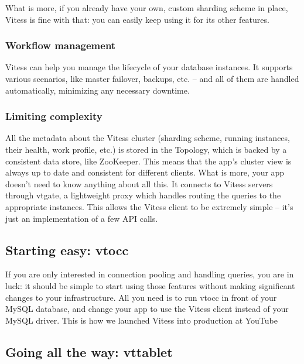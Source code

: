 What is more, if you already have your own, custom sharding scheme in place,
Vitess is fine with that: you can easily keep using it for its other features.

\subsubsection{Workflow management}\hypertarget{workflow-management}{}\label{workflow-management}

Vitess can help you manage the lifecycle of your database instances. It supports
various scenarios, like master failover, backups, etc. – and all of them are
handled automatically, minimizing any necessary downtime.

\subsubsection{Limiting complexity}\hypertarget{limiting-complexity}{}\label{limiting-complexity}

All the metadata about the Vitess cluster (sharding scheme, running instances,
their health, work profile, etc.) is stored in the Topology, which is backed by
a consistent data store, like ZooKeeper. This means that the app’s cluster view
is always up to date and consistent for different clients. What is more, your
app doesn’t need to know anything about all this. It connects to Vitess servers
through vtgate, a lightweight proxy which handles routing the queries to the
appropriate instances. This allows the Vitess client to be extremely simple –
it’s just an implementation of a few API calls.

\subsection{Starting easy: vtocc}\hypertarget{starting-easy-vtocc}{}\label{starting-easy-vtocc}

If you are only interested in connection pooling and handling queries, you are
in luck: it should be simple to start using those features without making
significant changes to your infrastructure. All you need is to run vtocc in
front of your MySQL database, and change your app to use the Vitess client
instead of your MySQL driver. This is how we launched Vitess into production at
YouTube

\subsection{Going all the way: vttablet}\hypertarget{going-all-the-way-vttablet}{}\label{going-all-the-way-vttablet}


